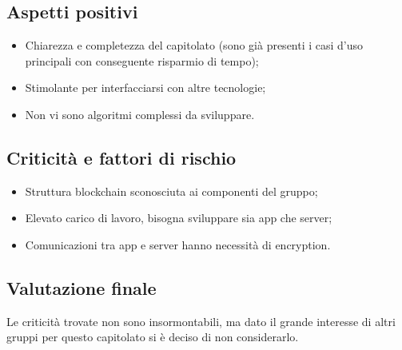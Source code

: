 \subsection{Aspetti positivi}
\begin{itemize}
\item Chiarezza e completezza del capitolato (sono già presenti i casi d'uso principali con conseguente risparmio di tempo);
\item Stimolante per interfacciarsi con altre tecnologie; 
\item Non vi sono algoritmi complessi da sviluppare.
\end{itemize}

\subsection{Criticità e fattori di rischio}
\begin{itemize}
\item Struttura blockchain sconosciuta ai componenti del gruppo;
\item Elevato carico di lavoro, bisogna sviluppare sia app che server;
\item Comunicazioni tra app e server hanno necessità di encryption.
\end{itemize}

\subsection{Valutazione finale}
Le criticità trovate non sono insormontabili, ma dato il grande interesse di altri gruppi per questo capitolato si è deciso di non considerarlo.
